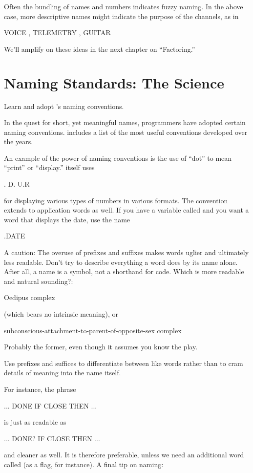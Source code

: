 Often the bundling of names and numbers indicates fuzzy naming.
In the above case, more descriptive names might indicate the purpose
of the channels, as in
\begin{Code}
VOICE , TELEMETRY , GUITAR
\end{Code}

We'll amplify on these ideas in the next chapter on ``Factoring.''

\section{Naming Standards: The Science}

\begin{tip}
Learn and adopt \Forth{}'s naming conventions.
\end{tip}
In the quest for short, yet meaningful names, \Forth{} programmers
have adopted certain naming conventions.   includes a list of
the most useful conventions developed over the years.

An example of the power of naming conventions is the use of ``dot''
to mean ``print'' or ``display.'' \Forth{} itself uses
\begin{Code}
.   D.   U.R
\end{Code}
for displaying various types of numbers in various formats.  The
convention extends to application words as well.  If you have a
variable called  and you want a word that displays the
date, use the name
\begin{Code}
.DATE
\end{Code}
A caution: The overuse of prefixes and suffixes makes words uglier and
ultimately less readable.  Don't try to describe everything a word
does by its name alone.  After all, a name is a symbol, not a
shorthand for code.  Which is more readable and natural sounding?:

\begin{tfquot}
Oedipus complex
\end{tfquot}
(which bears no intrinsic meaning), or
\begin{tfquot}
subconscious-attachment-to-parent-of-opposite-sex complex
\end{tfquot}
Probably the former, even though it assumes you know the play.

\begin{tip}
Use prefixes and suffices to differentiate between like words rather
than to cram details of meaning into the name itself.
\end{tip}
For instance, the phrase
\begin{Code}
... DONE IF CLOSE THEN ...
\end{Code}
is just as readable as
\begin{Code}
... DONE? IF CLOSE THEN ...
\end{Code}
and cleaner as well.  It is therefore preferable, unless we need an
additional word called  (as a flag, for instance).
A final tip on naming:

